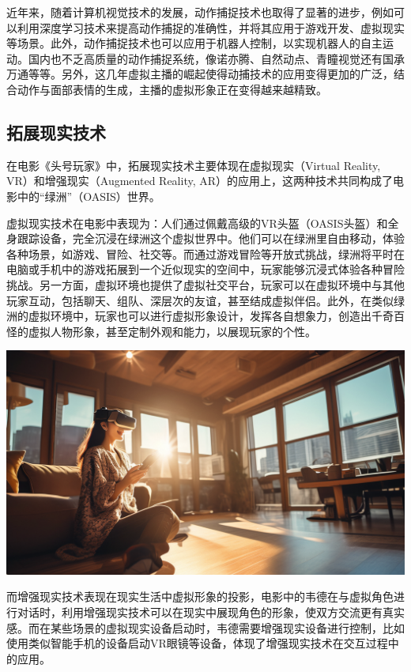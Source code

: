 近年来，随着计算机视觉技术的发展，动作捕捉技术也取得了显著的进步，例如可以利用深度学习技术来提高动作捕捉的准确性，并将其应用于游戏开发、虚拟现实等场景。此外，动作捕捉技术也可以应用于机器人控制，以实现机器人的自主运动。国内也不乏高质量的动作捕捉系统，像诺亦腾、自然动点、青瞳视觉还有国承万通等等。另外，这几年虚拟主播的崛起使得动捕技术的应用变得更加的广泛，结合动作与面部表情的生成，主播的虚拟形象正在变得越来越精致。

\subsection{拓展现实技术}
在电影《头号玩家》中，拓展现实技术主要体现在虚拟现实（Virtual Reality, VR）和增强现实（Augmented Reality, AR）的应用上，这两种技术共同构成了电影中的“绿洲”（OASIS）世界。

虚拟现实技术在电影中表现为：人们通过佩戴高级的VR头盔（OASIS头盔）和全身跟踪设备，完全沉浸在绿洲这个虚拟世界中。他们可以在绿洲里自由移动，体验各种场景，如游戏、冒险、社交等。而通过游戏冒险等开放式挑战，绿洲将平时在电脑或手机中的游戏拓展到一个近似现实的空间中，玩家能够沉浸式体验各种冒险挑战。另一方面，虚拟环境也提供了虚拟社交平台，玩家可以在虚拟环境中与其他玩家互动，包括聊天、组队、深层次的友谊，甚至结成虚拟伴侣。此外，在类似绿洲的虚拟环境中，玩家也可以进行虚拟形象设计，发挥各自想象力，创造出千奇百怪的虚拟人物形象，甚至定制外观和能力，以展现玩家的个性。

\begin{marginfigure}
    \includegraphics{images/tech_9.png}
\end{marginfigure}

而增强现实技术表现在现实生活中虚拟形象的投影，电影中的韦德在与虚拟角色进行对话时，利用增强现实技术可以在现实中展现角色的形象，使双方交流更有真实感。而在某些场景的虚拟现实设备启动时，韦德需要增强现实设备进行控制，比如使用类似智能手机的设备启动VR眼镜等设备，体现了增强现实技术在交互过程中的应用。

